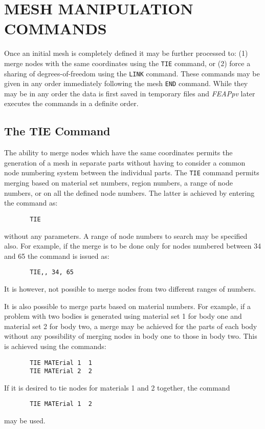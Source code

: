 \chapter[Mesh Manipulation Commands]{MESH MANIPULATION COMMANDS}
\label{manip}

Once an initial mesh is completely defined it may be further processed
to: (1) merge nodes with the same coordinates using the \texttt{TIE} command,
or (2) force a sharing of degrees-of-freedom using the \texttt{LINK}
command.  These commands may be given in any order immediately following
the mesh \texttt{END} command.  While they may be in any order the data is
first saved in temporary files and \textsl{FEAPpv} later executes the
commands in a definite order.

\section{The TIE Command}
\label{tie}

The ability to merge nodes which have the same coordinates permits
the generation of a mesh in separate parts without having to consider
a common node numbering system between the individual parts.
The \texttt{TIE} command permits merging
based on material set numbers, region numbers, a range of node numbers,
or on all the defined node numbers.
The latter is achieved by entering the command as:
\begin{verbatim}
       TIE
\end{verbatim}
without any parameters.  A range of node numbers to search may be
specified also.  For example, if the merge is to be done only for
nodes numbered between 34 and 65 the command is issued as:
\begin{verbatim}
       TIE,, 34, 65
\end{verbatim}
It is however, not possible to merge nodes from two different ranges of
numbers.

It is also possible to merge parts based on material numbers.  For example,
if a problem with two bodies is generated using material set 1
for body one and material set 2 for body two,
a merge may be achieved for the parts of each body
without any possibility of merging nodes in body one to those in
body two.  This is achieved using the commands:
\begin{verbatim}
       TIE MATErial 1  1
       TIE MATErial 2  2
\end{verbatim}
If it is desired to tie nodes for materials 1 and 2 together, the command
\begin{verbatim}
       TIE MATErial 1  2
\end{verbatim}
may be used.

